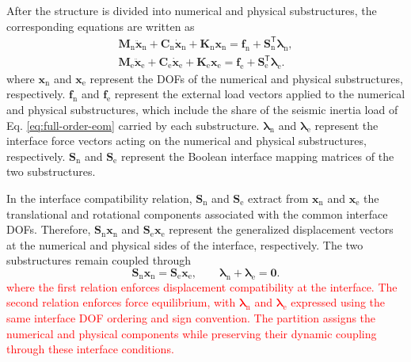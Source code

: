 \documentclass[11pt,a4paper]{article}
\numberwithin{equation}{section}
\newcommand{\rev}[1]{\textcolor{red}{#1}}
\begin{document}
After the structure is divided into numerical and physical substructures, the corresponding equations are written as
\begin{subequations}
	\label{eq:substructure-eom}
	\begin{align}
		\mathbf{M}_{\mathrm{n}}\ddot{\bm{x}}_{\mathrm{n}}
		+\mathbf{C}_{\mathrm{n}}\dot{\bm{x}}_{\mathrm{n}}
		+\mathbf{K}_{\mathrm{n}}\bm{x}_{\mathrm{n}}
		=\bm{f}_{\mathrm{n}}+\mathbf{S}_{\mathrm{n}}^{\mathsf{T}}\bm{\lambda}_{\mathrm{n}},
		\label{eq:numerical-eom}\\
		\mathbf{M}_{\mathrm{e}}\ddot{\bm{x}}_{\mathrm{e}}
		+\mathbf{C}_{\mathrm{e}}\dot{\bm{x}}_{\mathrm{e}}
		+\mathbf{K}_{\mathrm{e}}\bm{x}_{\mathrm{e}}
		=\bm{f}_{\mathrm{e}}+\mathbf{S}_{\mathrm{e}}^{\mathsf{T}}\bm{\lambda}_{\mathrm{e}}.
		\label{eq:physical-eom}
	\end{align}
\end{subequations}
where \(\bm{x}_{\mathrm{n}}\) and \(\bm{x}_{\mathrm{e}}\) represent the DOFs of the numerical and physical substructures, respectively. \(\bm{f}_{\mathrm{n}}\) and \(\bm{f}_{\mathrm{e}}\) represent the external load vectors applied to the numerical and physical substructures, which include the share of the seismic inertia load of Eq. \eqref{eq:full-order-eom} carried by each substructure. \(\bm{\lambda}_{\mathrm{n}}\) and \(\bm{\lambda}_{\mathrm{e}}\) represent the interface force vectors acting on the numerical and physical substructures, respectively. \(\mathbf{S}_{\mathrm{n}}\) and \(\mathbf{S}_{\mathrm{e}}\) represent the Boolean interface mapping matrices of the two substructures.

In the interface compatibility relation, \(\mathbf{S}_{\mathrm{n}}\) and \(\mathbf{S}_{\mathrm{e}}\) extract from \(\bm{x}_{\mathrm{n}}\) and \(\bm{x}_{\mathrm{e}}\) the translational and rotational components associated with the common interface DOFs. Therefore, \(\mathbf{S}_{\mathrm{n}}\bm{x}_{\mathrm{n}}\) and \(\mathbf{S}_{\mathrm{e}}\bm{x}_{\mathrm{e}}\) represent the generalized displacement vectors at the numerical and physical sides of the interface, respectively. The two substructures remain coupled through
\begin{equation}
	\mathbf{S}_{\mathrm{n}}\bm{x}_{\mathrm{n}}
	=\mathbf{S}_{\mathrm{e}}\bm{x}_{\mathrm{e}},
	\qquad
	\bm{\lambda}_{\mathrm{n}}+\bm{\lambda}_{\mathrm{e}}=\bm{0}.
	\label{eq:interface-conditions}
\end{equation}
\rev{where the first relation enforces displacement compatibility at the interface. The second relation enforces force equilibrium, with \(\bm{\lambda}_{\mathrm{n}}\) and \(\bm{\lambda}_{\mathrm{e}}\) expressed using the same interface DOF ordering and sign convention. The partition assigns the numerical and physical components while preserving their dynamic coupling through these interface conditions.}
\end{document}
